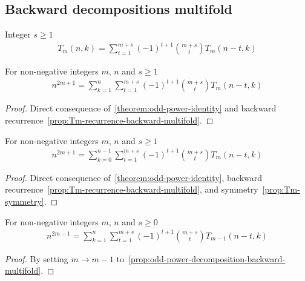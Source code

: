 \subsection{Backward decompositions multifold}
\label{subsec:backward-decompositions-multifold}
\begin{proposition}
    \label{prop:Tm-recurrence-backward-multifold}
    Integer $s \geq 1$
    \begin{align*}
        T_{m} (n, k) = \sum_{t=1}^{m+s} (-1)^{t+1} \binom{m+s}{t} T_{m} (n-t, k)
    \end{align*}
\end{proposition}

\begin{proposition}
    \label{prop:odd-power-decomposition-backward-multifold}
    For non-negative integers $m$, $n$ and $s \geq 1$
    \begin{align*}
        n^{2m+1} = \sum_{k=1}^{n} \sum_{t=1}^{m+s} (-1)^{t+1} \binom{m+s}{t} T_{m} (n-t, k)
    \end{align*}
    \begin{proof}
        Direct consequence of~\eqref{theorem:odd-power-identity}
        and backward recurrence~\eqref{prop:Tm-recurrence-backward-multifold}.
    \end{proof}
\end{proposition}

\begin{proposition}
    \label{prop:odd-power-decomposition-backward-shifted-multifold}
    For non-negative integers $m$, $n$ and $s \geq 1$
    \begin{align*}
        n^{2m+1} = \sum_{k=0}^{n-1} \sum_{t=1}^{m+s} (-1)^{t+1} \binom{m+s}{t} T_{m} (n-t, k)
    \end{align*}
    \begin{proof}
        Direct consequence of~\eqref{theorem:odd-power-identity},
        backward recurrence~\eqref{prop:Tm-recurrence-backward-multifold},
        and symmetry~\eqref{prop:Tm-symmetry}.
    \end{proof}
\end{proposition}

\begin{corollary}
    \label{cor:odd-power-decomposition-m-1-multifold}
    For non-negative integers $m$, $n$ and $s \geq 0$
    \begin{align*}
        n^{2m-1} = \sum_{k=1}^{n} \sum_{t=1}^{m+s} (-1)^{t+1} \binom{m+s}{t} T_{m-1} (n-t, k)
    \end{align*}
    \begin{proof}
        By setting $m \rightarrow m-1$ to~\eqref{prop:odd-power-decomposition-backward-multifold}.
    \end{proof}
\end{corollary}


